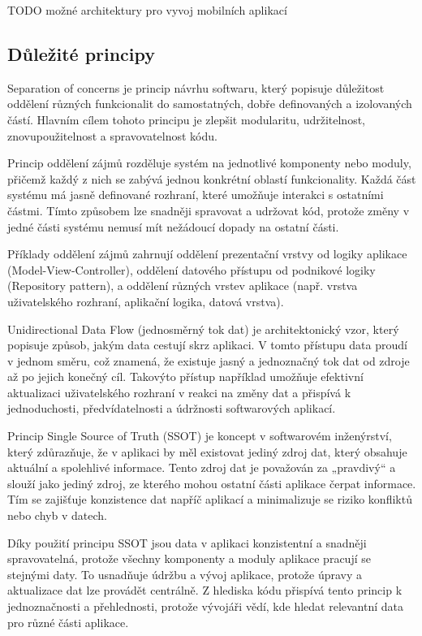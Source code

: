 TODO možné architektury pro vyvoj mobilních aplikací

\subsection*{Důležité principy}

Separation of concerns je princip návrhu softwaru, který popisuje důležitost oddělení různých funkcionalit do samostatných, dobře definovaných a izolovaných částí.
Hlavním cílem tohoto principu je zlepšit modularitu, udržitelnost, znovupoužitelnost a spravovatelnost kódu.

Princip oddělení zájmů rozděluje systém na jednotlivé komponenty nebo moduly, přičemž každý z nich se zabývá jednou konkrétní 
oblastí funkcionality. Každá část systému má jasně definované rozhraní, které umožňuje interakci s ostatními částmi. 
Tímto způsobem lze snadněji spravovat a udržovat kód, protože změny v jedné části systému nemusí mít nežádoucí dopady na ostatní části.

Příklady oddělení zájmů zahrnují oddělení prezentační vrstvy od logiky aplikace (Model-View-Controller), oddělení datového přístupu od 
podnikové logiky (Repository pattern), a oddělení různých vrstev aplikace (např. vrstva uživatelského rozhraní, aplikační logika, datová vrstva). 

Unidirectional Data Flow (jednosměrný tok dat) je architektonický vzor, který popisuje způsob, jakým data cestují skrz aplikaci. 
V tomto přístupu data proudí v jednom směru, což znamená, že existuje jasný a jednoznačný tok dat od zdroje až po jejich konečný cíl.
Takovýto přístup například umožňuje efektivní aktualizaci uživatelského rozhraní v reakci na změny dat a přispívá k jednoduchosti, 
předvídatelnosti a údržnosti softwarových aplikací.

Princip Single Source of Truth (SSOT) je koncept v softwarovém inženýrství, který zdůrazňuje, že v aplikaci by měl existovat jediný 
zdroj dat, který obsahuje aktuální a spolehlivé informace. Tento zdroj dat je považován za „pravdivý“ a slouží jako jediný zdroj, 
ze kterého mohou ostatní části aplikace čerpat informace. Tím se zajišťuje konzistence dat napříč aplikací a minimalizuje se riziko 
konfliktů nebo chyb v datech.

Díky použití principu SSOT jsou data v aplikaci konzistentní a snadněji spravovatelná, protože všechny komponenty a moduly aplikace pracují se stejnými 
daty. To usnadňuje údržbu a vývoj aplikace, protože úpravy a aktualizace dat lze provádět centrálně. Z hlediska kódu přispívá tento
princip k jednoznačnosti a přehlednosti, protože vývojáři vědí, kde hledat relevantní data pro různé části aplikace.

